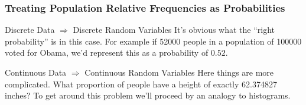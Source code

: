 \documentclass[handout]{beamer}
\begin{document}
\begin{frame}
\frametitle{Treating Population Relative Frequencies as Probabilities}
 
\begin{block}{Discrete Data $\Rightarrow$ Discrete Random Variables}
It's obvious what the ``right probability'' is in this case. For example if 52000 people in a population of 100000 voted for Obama, we'd represent this as a probability of $0.52$.
\end{block}

 
\begin{block}{Continuous Data $\Rightarrow$ Continuous Random Variables}
Here things are more complicated. What proportion of people have a height of exactly 62.374827 inches? To get around this problem we'll proceed by an analogy to histograms.
\end{block}

\end{frame}
\end{document}

